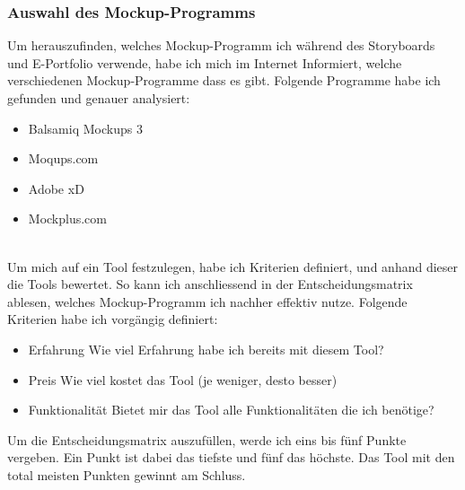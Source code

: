 \documentclass[11pt]{article}
\begin{document}
    \subsubsection{Auswahl des Mockup-Programms}
    Um herauszufinden, welches Mockup-Programm ich während des Storyboards und E-Portfolio verwende, habe ich
    mich im Internet Informiert, welche verschiedenen Mockup-Programme dass es gibt. Folgende Programme habe
    ich gefunden und genauer analysiert:

    \begin{itemize}
        \item Balsamiq Mockups 3
        \item Moqups.com
        \item Adobe xD
        \item Mockplus.com
    \end{itemize}\\

    Um mich auf ein Tool festzulegen, habe ich Kriterien definiert, und anhand dieser die Tools bewertet. So
    kann ich anschliessend in der Entscheidungsmatrix ablesen, welches Mockup-Programm ich nachher effektiv
    nutze. Folgende Kriterien habe ich vorgängig definiert:

    \begin{itemize}
        \item Erfahrung \textrightarrow Wie viel Erfahrung habe ich bereits mit diesem Tool?
        \item Preis \textrightarrow Wie viel kostet das Tool (je weniger, desto besser)
        \item Funktionalität \textrightarrow Bietet mir das Tool alle Funktionalitäten die ich benötige?
    \end{itemize}

    Um die Entscheidungsmatrix auszufüllen, werde ich eins bis fünf Punkte vergeben. Ein Punkt ist dabei das tiefste
    und fünf das höchste. Das Tool mit den total meisten Punkten gewinnt am Schluss.\\
\end{document}
